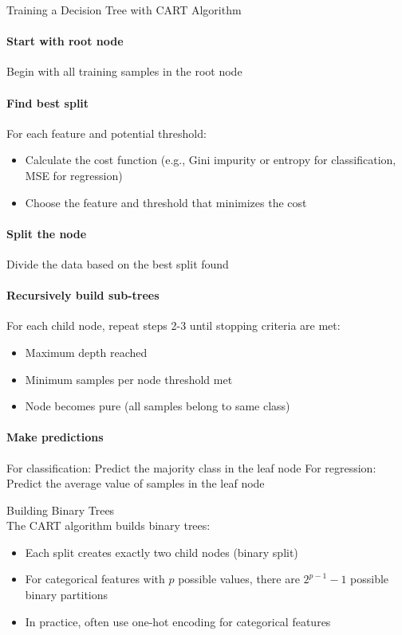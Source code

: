 \begin{KR}{Training a Decision Tree with CART Algorithm}
\paragraph{Start with root node}
Begin with all training samples in the root node

\paragraph{Find best split}
For each feature and potential threshold:
\begin{itemize}
    \item Calculate the cost function (e.g., Gini impurity or entropy for classification, MSE for regression)
    \item Choose the feature and threshold that minimizes the cost
\end{itemize}

\paragraph{Split the node}
Divide the data based on the best split found

\paragraph{Recursively build sub-trees}
For each child node, repeat steps 2-3 until stopping criteria are met:
\begin{itemize}
    \item Maximum depth reached
    \item Minimum samples per node threshold met
    \item Node becomes pure (all samples belong to same class)
\end{itemize}

\paragraph{Make predictions}
For classification: Predict the majority class in the leaf node
For regression: Predict the average value of samples in the leaf node
\end{KR}

\begin{concept}{Building Binary Trees}\\
The CART algorithm builds binary trees:
\begin{itemize}
    \item Each split creates exactly two child nodes (binary split)
    \item For categorical features with $p$ possible values, there are $2^{p-1} - 1$ possible binary partitions
    \item In practice, often use one-hot encoding for categorical features
\end{itemize}
\end{concept}

